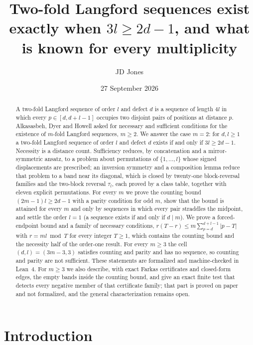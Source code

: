 \documentclass[11pt]{amsart}
\author{JD Jones}
\title[Two-fold Langford sequences]{Two-fold Langford sequences exist exactly when
$3l \ge 2d-1$, and what is known for every multiplicity}
\date{27 September 2026}
\theoremstyle{plain}
\theoremstyle{definition}
\theoremstyle{remark}
\begin{document}
\begin{abstract}
A two-fold Langford sequence of order $l$ and defect $d$ is a sequence of length $4l$
in which every $p \in [d,d+l-1]$ occupies two disjoint pairs of positions at distance
$p$. Alkasasbeh, Dyer and Howell asked for necessary and sufficient conditions for the
existence of $m$-fold Langford sequences, $m \ge 2$. We answer the case $m = 2$: for
$d, l \ge 1$ a two-fold Langford sequence of order $l$ and defect $d$ exists if and only
if $3l \ge 2d-1$. Necessity is a distance count. Sufficiency reduces, by concatenation
and a mirror-symmetric ansatz, to a problem about permutations of $\{1,\dots,l\}$ whose
signed displacements are prescribed; an inversion symmetry and a composition lemma
reduce that problem to a band near its diagonal, which is closed by twenty-one
block-reversal families and the two-block reversal $\tau_l$, each proved by a class
table, together with eleven explicit permutations. For every $m$ we prove the counting bound $(2m-1)l \ge 2d-1$ with a
parity condition for odd $m$, show that the bound is attained for every $m$ and only by
sequences in which every pair straddles the midpoint, and settle the order $l = 1$ (a
sequence exists if and only if $d \mid m$). We prove a forced-endpoint bound and a family
of necessary conditions, $r(T-r) \le m\sum_{p=d}^{d+l-1}|p-T|$ with $r = ml \bmod T$ for
every integer $T \ge 1$, which contains the counting bound and the necessity half of the
order-one result. For every $m \ge 3$ the cell $(d,l) = (3m-3,3)$ satisfies counting and
parity and has no sequence, so counting and parity are not sufficient. These
statements are formalized and machine-checked in Lean~4. For $m \ge 3$ we also describe,
with exact Farkas certificates and closed-form edges, the empty bands inside the counting
bound, and give an exact finite test that detects every negative member of that
certificate family; that part is proved on paper and not formalized, and the general
characterization remains open.
\end{abstract}

\maketitle

\section{Introduction}\label{sec:intro}
\end{document}
